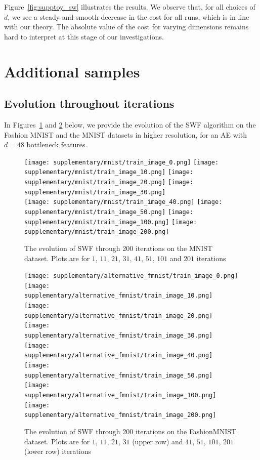 Figure~\ref{fig:supptoy_sw} illustrates the results. We observe that, for all choices of $d$, we see a steady and smooth decrease in the cost for all runs, which is in line with our theory. The absolute value of the cost for varying dimensions remains hard to interpret at this stage of our investigations.

\section{Additional samples}

\subsection{Evolution throughout iterations}

In Figures~\ref{fig:suppmnist} and \ref{fig:suppfmnist} below, we provide the evolution of the SWF algorithm on the Fashion MNIST and the MNIST datasets in higher resolution, for an AE with $d=48$ bottleneck features.

\newcommand{\picwidth}{0.2}%
\begin{figure}
\centering
\texttt{[image: supplementary/mnist/train\_image\_0.png]}
\texttt{[image: supplementary/mnist/train\_image\_10.png]}
\texttt{[image: supplementary/mnist/train\_image\_20.png]}
\texttt{[image: supplementary/mnist/train\_image\_30.png]}\\
\texttt{[image: supplementary/mnist/train\_image\_40.png]}
\texttt{[image: supplementary/mnist/train\_image\_50.png]}
\texttt{[image: supplementary/mnist/train\_image\_100.png]}
\texttt{[image: supplementary/mnist/train\_image\_200.png]}
\caption{The evolution of SWF through 200 iterations on the MNIST dataset. Plots are for $1$, $11$, $21$, $31$, $41$, $51$, $101$ and $201$ iterations}
\label{fig:suppmnist}
\end{figure}

\begin{figure}
\centering
\texttt{[image: supplementary/alternative\_fmnist/train\_image\_0.png]}%
\texttt{[image: supplementary/alternative\_fmnist/train\_image\_10.png]}%
\texttt{[image: supplementary/alternative\_fmnist/train\_image\_20.png]}%
\texttt{[image: supplementary/alternative\_fmnist/train\_image\_30.png]}\\%
\texttt{[image: supplementary/alternative\_fmnist/train\_image\_40.png]}%
\texttt{[image: supplementary/alternative\_fmnist/train\_image\_50.png]}%
\texttt{[image: supplementary/alternative\_fmnist/train\_image\_100.png]}%
\texttt{[image: supplementary/alternative\_fmnist/train\_image\_200.png]}%
\caption{The evolution of SWF through 200 iterations on the FashionMNIST dataset. Plots are for $1$, $11$, $21$, $31$ (upper row) and $41$, $51$, $101$, $201$ (lower row) iterations}
\label{fig:suppfmnist}
\end{figure}


